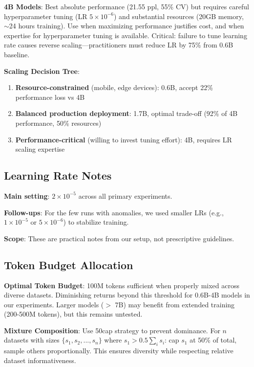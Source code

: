 \textbf{4B Models}: Best absolute performance (21.55 ppl, 55\% CV) but requires careful hyperparameter tuning (LR $5 \times 10^{-6}$) and substantial resources (20GB memory, $\sim$24 hours training). Use when maximizing performance justifies cost, and when expertise for hyperparameter tuning is available. Critical: failure to tune learning rate causes reverse scaling—practitioners must reduce LR by 75\% from 0.6B baseline.

\textbf{Scaling Decision Tree}:
\begin{enumerate}
\item \textbf{Resource-constrained} (mobile, edge devices): 0.6B, accept 22\% performance loss vs 4B
\item \textbf{Balanced production deployment}: 1.7B, optimal trade-off (92\% of 4B performance, 50\% resources)
\item \textbf{Performance-critical} (willing to invest tuning effort): 4B, requires LR scaling expertise
\end{enumerate}

\subsection{Learning Rate Notes}

\textbf{Main setting}: $2 \times 10^{-5}$ across all primary experiments.

\textbf{Follow-ups}: For the few runs with anomalies, we used smaller LRs (e.g., $1\times10^{-5}$ or $5\times10^{-6}$) to stabilize training.

\textbf{Scope}: These are practical notes from our setup, not prescriptive guidelines.

\subsection{Token Budget Allocation}

\textbf{Optimal Token Budget}: 100M tokens sufficient when properly mixed across diverse datasets. Diminishing returns beyond this threshold for 0.6B-4B models in our experiments. Larger models ($>$ 7B) may benefit from extended training (200-500M tokens), but this remains untested.

\textbf{Mixture Composition}: Use 50cap strategy to prevent dominance. For $n$ datasets with sizes $\{s_1, s_2, ..., s_n\}$ where $s_1 > 0.5 \sum_i s_i$: cap $s_1$ at 50\% of total, sample others proportionally. This ensures diversity while respecting relative dataset informativeness.

